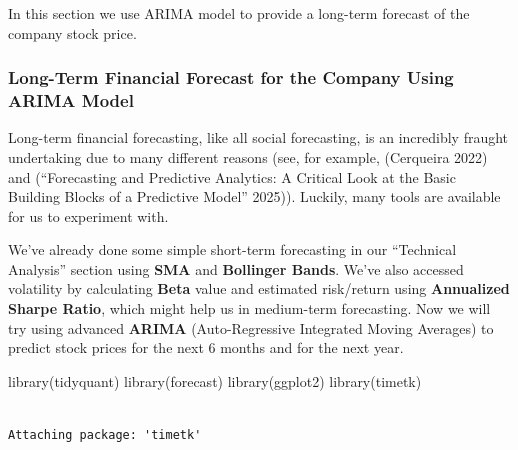 \documentclass[
  letterpaper,
  DIV=11,
  numbers=noendperiod]{scrartcl}
\newenvironment{Shaded}{\begin{snugshade}}{\end{snugshade}}
\newcommand{\FunctionTok}[1]{\textcolor[rgb]{0.28,0.35,0.67}{#1}}
\newcommand{\NormalTok}[1]{\textcolor[rgb]{0.00,0.23,0.31}{#1}}
\begin{document}
\begin{tcolorbox}[enhanced jigsaw, left=2mm, colback=white, opacityback=0, coltitle=black, arc=.35mm, leftrule=.75mm, bottomrule=.15mm, colbacktitle=quarto-callout-note-color!10!white, toptitle=1mm, title=\textcolor{quarto-callout-note-color}{\faInfo}\hspace{0.5em}{Note}, opacitybacktitle=0.6, bottomtitle=1mm, titlerule=0mm, breakable, rightrule=.15mm, toprule=.15mm, colframe=quarto-callout-note-color-frame]

In this section we use ARIMA model to provide a long-term forecast of
the company stock price.

\end{tcolorbox}

\subsubsection{\texorpdfstring{\textbf{Long-Term Financial Forecast for
the Company Using ARIMA
Model}}{Long-Term Financial Forecast for the Company Using ARIMA Model}}\label{long-term-financial-forecast-for-the-company-using-arima-model}

Long-term financial forecasting, like all social forecasting, is an
incredibly fraught undertaking due to many different reasons (see, for
example, (Cerqueira 2022) and ({``Forecasting and Predictive Analytics:
{A} Critical Look at the Basic Building Blocks of a Predictive Model''}
2025)). Luckily, many tools are available for us to experiment with.

We've already done some simple short-term forecasting in our ``Technical
Analysis'' section using \textbf{SMA} and \textbf{Bollinger Bands}.
We've also accessed volatility by calculating \textbf{Beta} value and
estimated risk/return using \textbf{Annualized Sharpe Ratio}, which
might help us in medium-term forecasting. Now we will try using advanced
\textbf{ARIMA} (Auto-Regressive Integrated Moving Averages) to predict
stock prices for the next 6 months and for the next year.

\begin{Shaded}
\begin{Highlighting}[]
\FunctionTok{library}\NormalTok{(tidyquant)}
\FunctionTok{library}\NormalTok{(forecast)}
\FunctionTok{library}\NormalTok{(ggplot2)}
\FunctionTok{library}\NormalTok{(timetk)}
\end{Highlighting}
\end{Shaded}

\begin{verbatim}

Attaching package: 'timetk'
\end{verbatim}
\end{document}
